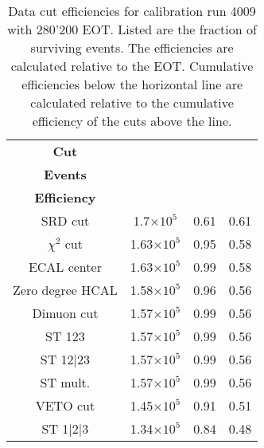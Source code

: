 \begin{table}[htbp]
	\centering
	\caption[Data cut efficiencies for calibration run 4009.]{Data cut efficiencies for calibration run 4009 with 280'200 EOT. Listed are the fraction of surviving events. The efficiencies are calculated relative to the EOT. Cumulative efficiencies below the horizontal line are calculated relative to the cumulative efficiency of the cuts above the line.}
	\begin{tabular}{|cccc|}
		\toprule
		\textbf{Cut} & \thead{\textbf{Surviving}\\\textbf{Events}} & \thead{\textbf{Efficiency}}& \thead{\textbf{Cumulative}\\\textbf{Efficiency}}\\
		\midrule
		SRD cut & 1.7$\times 10^5$ & 0.61 & 0.61\\
		$\chi^2$ cut & 1.63$\times 10^5$ & 0.95 & 0.58\\
		ECAL center & 1.63$\times 10^5$ & 0.99 & 0.58\\
		Zero degree HCAL & 1.58$\times 10^5$ & 0.96 & 0.56\\
		Dimuon cut & 1.57$\times 10^5$ & 0.99 & 0.56\\
		\midrule
		ST 123 & 1.57$\times 10^5$ & 0.99 & 0.56\\
		ST 12|23 & 1.57$\times 10^5$ & 0.99 & 0.56\\
		ST mult. & 1.57$\times 10^5$ & 0.99 & 0.56\\ 
		VETO cut  & 1.45$\times 10^5$ & 0.91 & 0.51\\
		ST 1|2|3 & 1.34$\times 10^5$ & 0.84 & 0.48\\
		\bottomrule
	\end{tabular}
	\label{res:Tab:event_selection}
\end{table}

\iffalse
\begin{table}[bth!]
  \centering
  \begin{tabular}{|lrr|}
    &&
  \end{tabular}
  \caption[efficiency cuts invisible mode]{efficiency and uncertainty for the cut in the invisible mode of 2018}
  \label{tab:inv-cut-eff}
\end{table}
\fi

